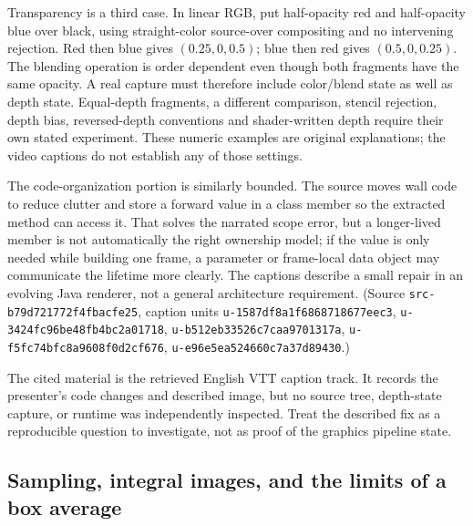 Transparency is a third case. In linear RGB, put half-opacity red and half-opacity blue over black, using straight-color source-over compositing and no intervening rejection. Red then blue gives \((0.25,0,0.5)\); blue then red gives \((0.5,0,0.25)\). The blending operation is order dependent even though both fragments have the same opacity. A real capture must therefore include color/blend state as well as depth state. Equal-depth fragments, a different comparison, stencil rejection, depth bias, reversed-depth conventions and shader-written depth require their own stated experiment. These numeric examples are original explanations; the video captions do not establish any of those settings.

The code-organization portion is similarly bounded. The source moves wall code to reduce clutter and store a forward value in a class member so the extracted method can access it. That solves the narrated scope error, but a longer-lived member is not automatically the right ownership model; if the value is only needed while building one frame, a parameter or frame-local data object may communicate the lifetime more clearly. The captions describe a small repair in an evolving Java renderer, not a general architecture requirement. (Source \texttt{src-b79d721772f4fbacfe25}, caption units \texttt{u-1587df8a1f6868718677eec3}, \texttt{u-3424fc96be48fb4bc2a01718}, \texttt{u-b512eb33526c7caa9701317a}, \texttt{u-f5fc74bfc8a9608f0d2cf676}, \texttt{u-e96e5ea524660c7a37d89430}.)

The cited material is the retrieved English VTT caption track. It records the presenter's code changes and described image, but no source tree, depth-state capture, or runtime was independently inspected. Treat the described fix as a reproducible question to investigate, not as proof of the graphics pipeline state.

\subsection{Sampling, integral images, and the limits of a box average}\label{03-visual-computing-i-ch004-sampling-integral-images-and-the-limits-of-a-box-average}

